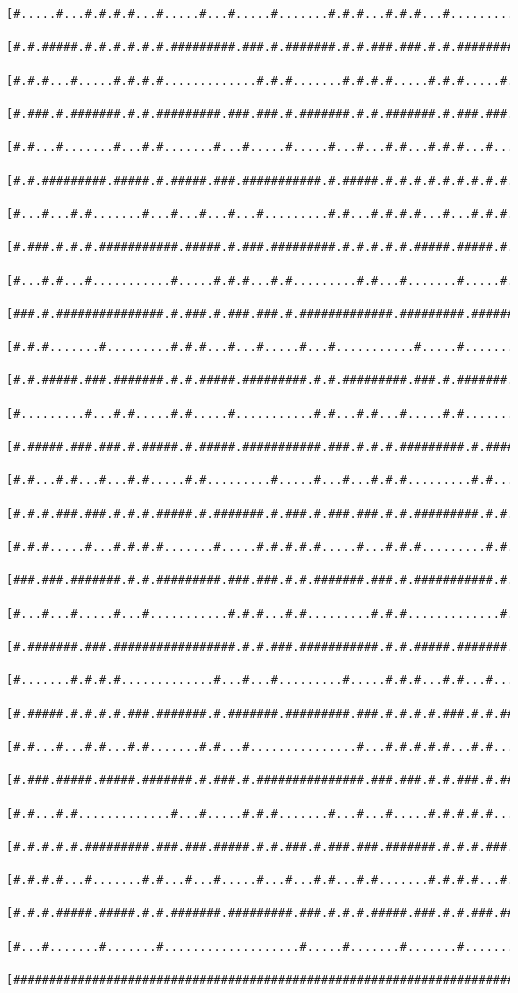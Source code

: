 \documentclass[a4paper,10pt,ngerman]{scrartcl}
\begin{document}
\begin{lstlisting}[frame=tb,basicstyle=\tiny\ttfamily]
 [#.....#...#.#.#.#...#.....#...#.....#.......#.#.#...#.#.#...#.........#.#...#...#...#.......#.....#.#]
 [#.#.#####.#.#.#.#.#.#.#########.###.#.#######.#.#.###.###.#.#.#########.#.###.###.###.#####.#####.#.#]
 [#.#.#...#.....#.#.#.#.............#.#.#.......#.#.#.#.....#.#.#.....#...#.#.....#.#...#...#.#...#.#.#]
 [#.###.#.#######.#.#.#########.###.###.#.#######.#.#.#######.#.###.###.###.#######.#.###.#.###.#.#.#.#]
 [#.#...#.......#...#.#.......#...#.....#.....#...#...#.#...#.#.#...#...#...........#...#.#.....#.#...#]
 [#.#.#########.#####.#.#####.###.###########.#.#####.#.#.#.#.#.#.#.#.#.#################.#######.#####]
 [#...#...#.#.......#...#...#...#...#.........#.#...#.#.#.#...#...#.#.#.#.........#.......#.....#.....#]
 [#.###.#.#.#.###########.#####.#.###.#########.#.#.#.#.#.#####.#####.#.#.#######.#.#######.#.#######.#]
 [#...#.#...#...........#.....#.#.#...#.#.........#.#...#.......#.....#.#.#...#...#.....#...#.....#...#]
 [###.#.###############.#.###.#.###.###.#.#############.#########.#######.#.###.#######.#.#######.#.#.#]
 [#.#.#.......#.........#.#.#...#...#.....#...#...........#.....#.......#.#.#...#.....#.#.....#...#.#.#]
 [#.#.#####.###.#######.#.#.#####.#########.#.#.#########.###.#.#######.#.#.#.###.#.###.#######.###.#.#]
 [#.........#...#.#.....#.#.....#...........#.#...#.#...#.....#.#.......#.#.#.....#.............#...#.#]
 [#.#####.###.###.#.#####.#.#####.###########.###.#.#.#.#########.#.#####.#.#####################.###.#]
 [#.#...#.#...#...#.#.....#.#.........#.....#...#...#.#.#.........#.#...#.#...........#.......#...#...#]
 [#.#.#.###.###.#.#.#.#####.#.#######.#.###.#.###.###.#.#.#########.#.#.#.#.#.#########.#####.#.###.###]
 [#.#.#.....#...#.#.#.#.......#.....#.#.#.#.#.....#...#.#.#.........#.#.#...#.#.........#...#...#.#.#.#]
 [###.###.#######.#.#.#########.###.###.#.#.#######.###.#.###########.#.#####.#.###########.#####.#.#.#]
 [#...#...#.....#...#...........#.#.#...#.#.........#.#.#.............#.#.....#.#...#.....#.......#...#]
 [#.#######.###.#################.#.#.###.###########.#.#.#####.#######.#.#####.#.#.###.#.#.#.#######.#]
 [#.......#.#.#.#.............#...#...#.........#.....#.#.#...#.#...#...#.#.#...#.#.....#...#.#.....#.#]
 [#.#####.#.#.#.#.###.#######.#.#######.#########.###.#.#.#.#.###.#.#.###.#.#.###.#############.###.#.#]
 [#.#...#...#.#...#.#.......#.#...#...............#...#.#.#.#.#...#.#.....#.#...#.............#...#...#]
 [#.###.#####.#####.#######.#.###.#.###############.###.###.#.#.###.#.#####.###.###.#########.###.#####]
 [#.#...#.#.............#...#.....#.#.#.......#...#...#.....#.#.#.#.#...#.....#...#.#.....#.....#.#...#]
 [#.#.#.#.#.#########.###.###.#####.#.#.###.#.###.###.#######.#.#.#.###.#.###.###.#.#.#####.#.###.###.#]
 [#.#.#.#...#.......#.#...#...#.....#...#...#.#...#.#.......#.#.#.#...#...#.....#.#.#...#...#.#...#...#]
 [#.#.#.#####.#####.#.#.#######.#########.###.#.#.#.#####.###.#.#.###.###########.#.###.#.#####.###.#.#]
 [#...#.......#.......#...................#.....#.......#.......#.................#.....#...........#.#]
 [#####################################################################################################]]
\end{lstlisting}
\end{document}
